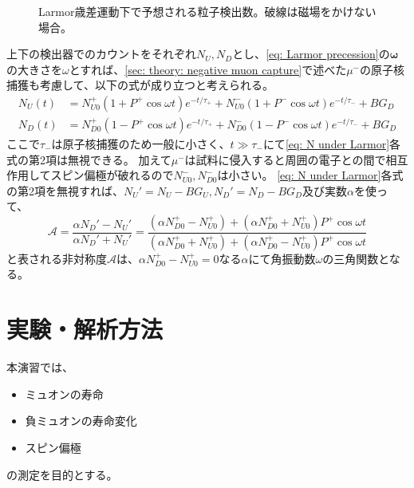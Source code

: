 \documentclass[dvipdfmx]{jsarticle}
\begin{document}
\begin{figure}
    \centering
    
    \caption[]{Larmor歳差運動下で予想される粒子検出数。破線は磁場をかけない場合。}
    \label{fig: theory: N under Larmor}
\end{figure}

上下の検出器でのカウントをそれぞれ$N_U, N_D$とし、\eqref{eq: Larmor precession}の$\bm{\omega}$の大きさを$\omega$とすれば、\ref{sec: theory: negative muon capture}で述べた$\mu^-$の原子核捕獲も考慮して、以下の式が成り立つと考えられる。
\begin{equation}
    \label{eq: N under Larmor}
    \begin{split}
        N_U(t)
        &=
        N_{U0}^+(1+P^+\cos\omega t)e^{-t/\tau_+}
        +
        N_{U0}^-(1+P^-\cos\omega t)e^{-t/\tau_-}
        +
        BG_D
        \\
        N_D(t)
        &=
        N_{D0}^+(1-P^+\cos\omega t)e^{-t/\tau_+}
        +
        N_{D0}^-(1-P^-\cos\omega t)e^{-t/\tau_-}
        +
        BG_D
    \end{split}
\end{equation}
ここで$\tau_-$は原子核捕獲のため一般に小さく、$t\gg\tau_-$にて\eqref{eq: N under Larmor}各式の第2項は無視できる。
加えて$\mu^-$は試料に侵入すると周囲の電子との間で相互作用してスピン偏極が破れるので$N_{U0}^-,N_{D0}^-$は小さい。
\eqref{eq: N under Larmor}各式の第2項を無視すれば、$N_U'=N_U-BG_U, N_D'=N_D-BG_D$及び実数$\alpha$を使って、
\begin{equation}
    \label{eq: asymmetry}
    \mathscr{A}
    =
    \frac{\alpha N_D'-N_U'}{\alpha N_D'+N_U'}
    =
    \frac{(\alpha N_{D0}^+-N_{U0}^+)+(\alpha N_{D0}^++N_{U0}^+)P^+\cos\omega t}{(\alpha N_{D0}^++N_{U0}^+)+(\alpha N_{D0}^+-N_{U0}^+)P^+\cos\omega t}
\end{equation}
と表される非対称度$\mathscr{A}$は、$\alpha N_{D0}^+-N_{U0}^+=0$なる$\alpha$にて角振動数$\omega$の三角関数となる。


\section{実験・解析方法}

本演習では、
\begin{itemize}
    \item ミュオンの寿命
    \item 負ミュオンの寿命変化
    \item スピン偏極
\end{itemize}
の測定を目的とする。
\end{document}

